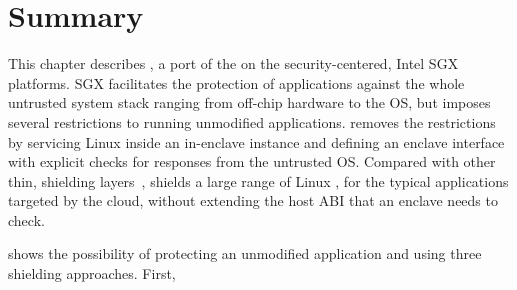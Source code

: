 \section{Summary}

This chapter describes \graphenesgx{},
a port of the \graphene{} \libos{} on the security-centered, Intel SGX platforms.
SGX facilitates the protection of applications
against the whole untrusted system stack ranging from off-chip hardware to the OS,
but imposes several restrictions to running unmodified applications.
\graphenesgx{} removes the restrictions
by servicing Linux \linuxapis{} inside an in-enclave \libos{} instance and defining an enclave interface with explicit checks for responses from the untrusted OS.
Compared with other thin, shielding layers~\cite{osdi16scone,shinde17panoply}, \graphenesgx{} shields a large range of Linux \linuxapis{},
for the typical applications targeted by the cloud,
without extending the host ABI that an enclave needs to check.



\graphenesgx{} shows the possibility
of protecting an unmodified application and \libos{} using three shielding approaches.
First, 